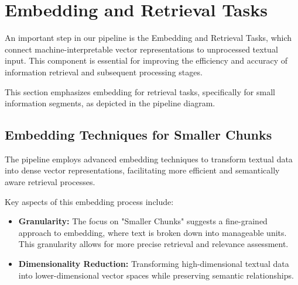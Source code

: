 \section{Embedding and Retrieval Tasks}\label{sec:embedding-and-retrieval-tasks}
An important step in our pipeline is the Embedding and Retrieval Tasks, which connect machine-interpretable vector representations to unprocessed textual input.
This component is essential for improving the efficiency and accuracy of information retrieval and subsequent processing stages.

This section emphasizes embedding for retrieval tasks, specifically for small information segments, as depicted in the pipeline diagram.

\subsection{Embedding Techniques for Smaller Chunks}\label{subsec:embedding-techniques-for-smaller-chunks}
The pipeline employs advanced embedding techniques to transform textual data into dense vector representations, facilitating more efficient and semantically aware retrieval processes.

Key aspects of this embedding process include:
\begin{itemize}
    \item \textbf{Granularity:} The focus on "Smaller Chunks" suggests a fine-grained approach to embedding, where text is broken down into manageable units. This granularity allows for more precise retrieval and relevance assessment.
    \item \textbf{Dimensionality Reduction:} Transforming high-dimensional textual data into lower-dimensional vector spaces while preserving semantic relationships.
\end{itemize}

%
%

